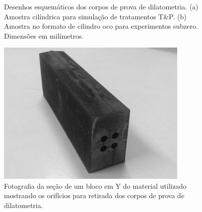 \begin{figure}
	\hspace{5em}
	\caption{Desenhos esquemáticos dos corpos de prova de dilatometria. (a) Amostra cilíndrica para simulação de tratamentos T\&P. (b) Amostra no formato de cilindro oco para experimentos subzero. Dimensões em milímetros.}
	\label{fig:CPdil}
\end{figure}

\begin{figure}
	\includegraphics[height=7cm]{img/eletroerosaoBlocoY.pdf}
	\caption{Fotografia da seção de um bloco em Y do material utilizado mostrando os orifícios para retirada dos corpos de prova de dilatometria.}
	\label{fig:eletroerosaoBlocoY}
\end{figure}

